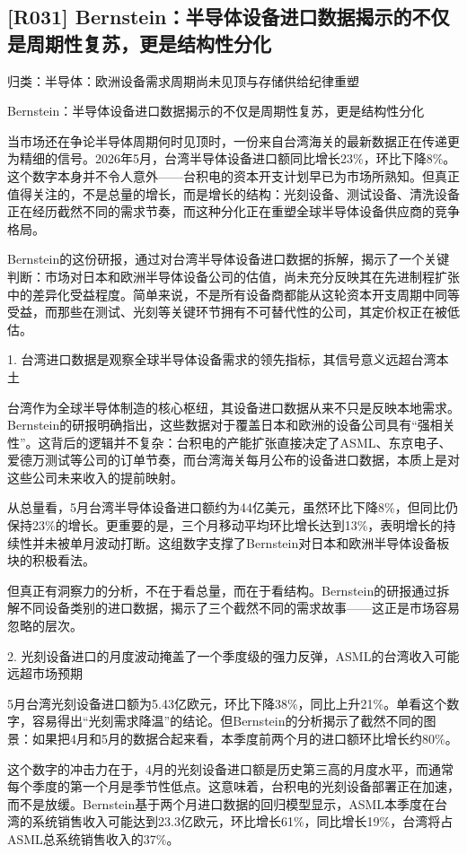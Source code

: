 \documentclass[11pt]{ctexart}
\begin{document}
\subsection{[R031] Bernstein：半导体设备进口数据揭示的不仅是周期性复苏，更是结构性分化}
{\small\color{refgray}归类：半导体：欧洲设备需求周期尚未见顶与存储供给纪律重塑}

Bernstein：半导体设备进口数据揭示的不仅是周期性复苏，更是结构性分化

当市场还在争论半导体周期何时见顶时，一份来自台湾海关的最新数据正在传递更为精细的信号。2026年5月，台湾半导体设备进口额同比增长23\%，环比下降8\%。这个数字本身并不令人意外——台积电的资本开支计划早已为市场所熟知。但真正值得关注的，不是总量的增长，而是增长的结构：光刻设备、测试设备、清洗设备正在经历截然不同的需求节奏，而这种分化正在重塑全球半导体设备供应商的竞争格局。

Bernstein的这份研报，通过对台湾半导体设备进口数据的拆解，揭示了一个关键判断：市场对日本和欧洲半导体设备公司的估值，尚未充分反映其在先进制程扩张中的差异化受益程度。简单来说，不是所有设备商都能从这轮资本开支周期中同等受益，而那些在测试、光刻等关键环节拥有不可替代性的公司，其定价权正在被低估。

1. 台湾进口数据是观察全球半导体设备需求的领先指标，其信号意义远超台湾本土

台湾作为全球半导体制造的核心枢纽，其设备进口数据从来不只是反映本地需求。Bernstein的研报明确指出，这些数据对于覆盖日本和欧洲的设备公司具有“强相关性”。这背后的逻辑并不复杂：台积电的产能扩张直接决定了ASML、东京电子、爱德万测试等公司的订单节奏，而台湾海关每月公布的设备进口数据，本质上是对这些公司未来收入的提前映射。

从总量看，5月台湾半导体设备进口额约为44亿美元，虽然环比下降8\%，但同比仍保持23\%的增长。更重要的是，三个月移动平均环比增长达到13\%，表明增长的持续性并未被单月波动打断。这组数字支撑了Bernstein对日本和欧洲半导体设备板块的积极看法。

但真正有洞察力的分析，不在于看总量，而在于看结构。Bernstein的研报通过拆解不同设备类别的进口数据，揭示了三个截然不同的需求故事——这正是市场容易忽略的层次。

2. 光刻设备进口的月度波动掩盖了一个季度级的强力反弹，ASML的台湾收入可能远超市场预期

5月台湾光刻设备进口额为5.43亿欧元，环比下降38\%，同比上升21\%。单看这个数字，容易得出“光刻需求降温”的结论。但Bernstein的分析揭示了截然不同的图景：如果把4月和5月的数据合起来看，本季度前两个月的进口额环比增长约80\%。

这个数字的冲击力在于，4月的光刻设备进口额是历史第三高的月度水平，而通常每个季度的第一个月是季节性低点。这意味着，台积电的光刻设备部署正在加速，而不是放缓。Bernstein基于两个月进口数据的回归模型显示，ASML本季度在台湾的系统销售收入可能达到23.3亿欧元，环比增长61\%，同比增长19\%，台湾将占ASML总系统销售收入的37\%。
\end{document}
